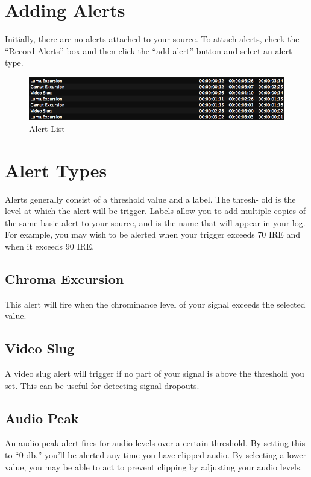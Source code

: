 \documentclass[10,letterpaper,]{report}
\begin{document}
\section{Adding Alerts}

Initially, there are no alerts attached to your source. To attach
alerts, check the ``Record Alerts'' box and then click the ``add alert''
button and select an alert type.

\begin{figure}[htbp]
\centering
\includegraphics{images/alertList.png}
\caption{Alert List}
\end{figure}

\section{Alert Types}

Alerts generally consist of a threshold value and a label. The thresh-
old is the level at which the alert will be trigger. Labels allow you to
add multiple copies of the same basic alert to your source, and is the
name that will appear in your log. For example, you may wish to be
alerted when your trigger exceeds 70 IRE and when it exceeds 90 IRE.

\subsection{Chroma Excursion}

This alert will fire when the chrominance level of your signal exceeds
the selected value.

\subsection{Video Slug}

A video slug alert will trigger if no part of your signal is above the
threshold you set. This can be useful for detecting signal dropouts.

\subsection{Audio Peak}

An audio peak alert fires for audio levels over a certain threshold. By
setting this to ``0 db,'' you'll be alerted any time you have clipped
audio. By selecting a lower value, you may be able to act to prevent
clipping by adjusting your audio levels.
\end{document}
